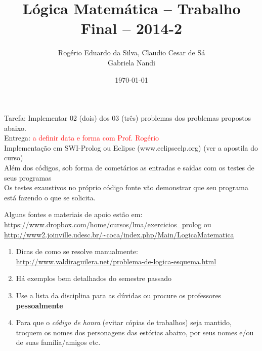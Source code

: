\documentclass[a4paper,12pt]{article}
\title{Lógica Matemática -- Trabalho Final -- 2014-2}
\author{Rogério Eduardo da Silva, Claudio Cesar de Sá\\
Gabriela Nandi}
\date{\today}
\begin{document}
\maketitle

\begin{flushleft}

\vspace{0.2cm}
 Tarefa: Implementar 02 (dois) dos  03 (três)  problemas dos problemas propostos abaixo.\\
Entrega: \textcolor{red}{a definir data e forma com Prof. Rogério} \\ 

\vspace{0.2cm}
 Implementação em SWI-Prolog ou Eclipse (www.eclipseclp.org) (ver a apostila do curso)\\

\vspace{0.2cm}
 Além dos códigos, sob forma de cometários as entradas e saídas com os testes de seus programas\\

\vspace{0.2cm}
 Os testes exaustivos no próprio código fonte vão demonstrar que seu programa está fazendo o que se solicita.

\vspace{0.2cm}
 Alguns fontes e materiais de apoio estão em:
 \url{https://www.dropbox.com/home/cursos/lma/exercicios_prolog} ou \\
  \url{http://www2.joinville.udesc.br/~coca/index.php/Main/LogicaMatematica}

\end{flushleft}

\begin{enumerate}
\setlength\itemsep{0.1cm}
\item Dicas de como se resolve manualmente:\\
\url{http://www.valdiraguilera.net/problema-de-logica-esquema.html}

\item Há exemplos bem detalhados do semestre passado

\item Use a lista da disciplina para as dúvidas ou procure os professores \textbf{pessoalmente}

\item Para que o \textit{código de honra} (evitar cópias de trabalhos) seja mantido, troquem os nomes dos personagens das estórias abaixo, por seus nomes e/ou de suas família/amigos etc. 

\end{enumerate}
\end{document}
